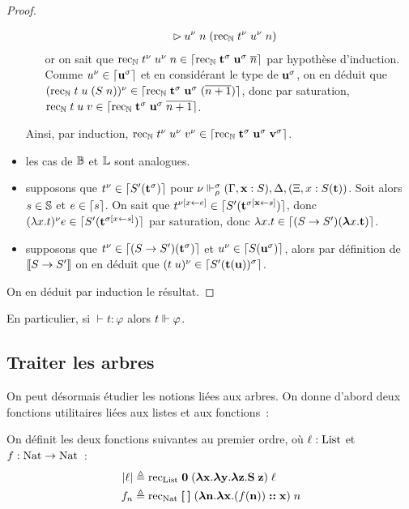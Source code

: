 \documentclass{article}
\begin{document}
\begin{proof}
\begin{itemize}
\begin{itemize}
\begin{align*}
        &\rhd u^\nu\;n\;(\mathrm{rec}_{\mathbb{N}}\;t^\nu\;u^\nu\;n)
      \end{align*}
      or on sait que $\mathrm{rec}_{\mathbb{N}}\;t^\nu\;u^\nu\;n\in\lceil \mathrm{rec}_{\mathbb{N}}\;\mathbf{t}^\sigma\;\mathbf{u}^\sigma\;\overline n \rceil$ par hypothèse d'induction. Comme $u^\nu \in \lceil \mathbf{u}^\sigma \rceil$ et en considérant le type de $\mathbf{u}^\sigma$, on en déduit que $(\mathrm{rec}_{\mathbb{N}}\;t\;u\;(S\;n))^\nu \in \lceil \mathrm{rec}_{\mathbb{N}}\;\mathbf{t}^\sigma\;\mathbf{u}^\sigma\;(\overline{n+1}) \rceil$, donc par saturation, $\mathrm{rec}_{\mathbb{N}}\;t\;u\;v\in\lceil \mathrm{rec}_{\mathbb{N}}\;\mathbf{t}^\sigma\;\mathbf{u}^\sigma\;\overline{n+1} \rceil$.
    \end{itemize}
    Ainsi, par induction, $\mathrm{rec}_{\mathbb{N}}\;t^\nu\;u^\nu\;v^\nu \in \lceil \mathrm{rec}_{\mathbb{N}}\;\mathbf{t}^\sigma\;\mathbf{u}^\sigma\;\mathbf{v}^\sigma \rceil$.
  \item les cas de $\mathbb{B}$ et $\mathbb{L}$ sont analogues.
  \item supposons que $t^\nu\in\lceil S'(\mathbf{t}^\sigma) \rceil$ pour $\nu\Vdash_\rho^\sigma (\Gamma, \mathbf{x} : S), \Delta,(\Xi, x : S(\mathbf{t}))$. Soit alors $s\in\mathbb{S}$ et $e\in \lceil s \rceil$. On sait que $t^{\nu[x\leftarrow e]}\in\lceil S'(\mathbf{t}^{\sigma[\mathbf{x}\leftarrow s]}) \rceil$, donc $(\lambda x.t)^\nu e \in \lceil S'(\mathbf{t}^{\sigma[x\leftarrow s]}) \rceil$ par saturation, donc $\lambda x.t\in\lceil (S\to S')(\boldsymbol{\lambda} x.\mathbf{t}) \rceil$.
  \item supposons que $t^\nu \in\lceil (S\to S')(\mathbf{t}^\sigma) \rceil$ et $u^\nu \in\lceil S(\mathbf{u}^\sigma) \rceil$, alors par définition de $\llbracket S\to S' \rrbracket$ on en déduit que $(t\;u)^\nu\in\lceil S'(\mathbf{t}(\mathbf{u}))^\sigma \rceil$.
  \end{itemize}

  On en déduit par induction le résultat.
\end{proof}

En particulier, si $\vdash t : \varphi$ alors $t\Vdash \varphi$.

\subsection{Traiter les arbres}

On peut désormais étudier les notions liées aux arbres. On donne d'abord deux fonctions utilitaires liées aux listes et aux fonctions~:

\begin{defi}
  On définit les deux fonctions suivantes au premier ordre, où $\ell : \mathrm{List}$ et $f : \mathrm{Nat}\to\mathrm{Nat}$~:
  \begin{align*}
    |\ell| &\triangleq \mathrm{rec}_{\mathrm{List}}\;\boldsymbol 0\;(\boldsymbol{\lambda} \mathbf{x}.\boldsymbol{\lambda}\mathbf{y}.\boldsymbol{\lambda}\mathbf{z}.\mathbf{S}\;\mathbf{z})\;\ell\\
    f_n &\triangleq \mathrm{rec}_{\mathrm{Nat}}\;\boldsymbol{ [ }\:\boldsymbol{ ] }\;(\boldsymbol{\lambda} \mathbf{n}.\boldsymbol{\lambda} \mathbf{x}.(f(\mathbf{n}))\boldsymbol{:}\boldsymbol{:} \mathbf{x})\;n
  \end{align*}
\end{defi}
\end{document}
